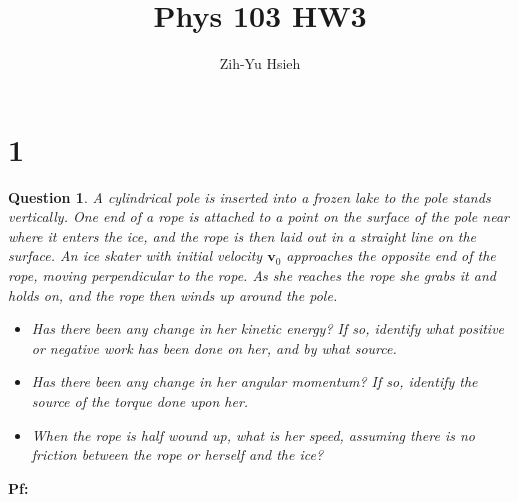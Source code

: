 \documentclass{article}
\title{Phys 103 HW3}
\author{Zih-Yu Hsieh}
\newtheorem{question}{Question}
\newcommand{\bv}{\textbf{v}}
\begin{document}
\maketitle

\section*{1}
\begin{question}\label{q1}
    A cylindrical pole is inserted into a frozen lake to the pole stands vertically. One end of a rope is attached to a point on the surface of the pole near where it enters the ice, and the rope is then laid out in a straight line on the surface. An ice skater with initial velocity $\bv_0$ approaches the opposite end of the rope, moving perpendicular to the rope. As she reaches the rope she grabs it and holds on, and the rope then winds up around the pole.
    \begin{itemize}
        \item[(a)] Has there been any change in her kinetic energy? If so, identify what positive or negative work has been done on her, and by what source.
        \item[(b)] Has there been any change in her angular momentum? If so, identify the source of the torque done upon her.
        \item[(c)] When the rope is half wound up, what is her speed, assuming there is no friction between the rope or herself and the ice?
    \end{itemize}
\end{question}

\textbf{Pf:}

\break
\end{document}
